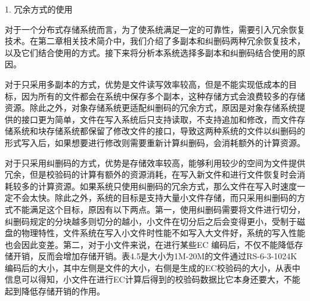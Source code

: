 1. 冗余方式的使用

对于一个分布式存储系统而言，为了使系统满足一定的可靠性，需要引入冗余恢复技术。在第二章相关技术简介中，我们介绍了多副本和纠删码两种冗余恢复技术，以及它们结合使用的方式。接下来将分析本系统选择多副本和纠删码结合使用的原因。

对于只采用多副本的方式，优势是文件读写效率较高，但是不能实现低成本的目标，因为所有的文件都会在系统中保存多个副本，这种存储方式会浪费较多的存储资源。除此之外，对象存储系统更适配纠删码的冗余方式，原因是对象存储系统提供的接口更为简单，文件在写入系统后只支持读取，不支持追加和修改，而文件存储系统和块存储系统都保留了修改文件的接口，导致这两种系统的文件以纠删码的形式写入后，如果想要进行修改则需要重新计算纠删码，会消耗额外的计算资源。

对于只采用纠删码的方式，优势是存储效率较高，能够利用较少的空间为文件提供冗余，但是校验码的计算有额外的资源消耗，在写入新文件和进行文件恢复时会消耗较多的计算资源。如果系统只使用纠删码的冗余方式，那么文件在写入时速度一定不会太快。除此之外，系统的目标是支持大量小文件存储，而只采用纠删码的方式不能满足这个目标，原因有以下两点。第一，使用纠删码需要将文件进行切分，纠删码规定的分块越多则切分的越小，小文件在切分后之后会变得更小，受制于磁盘的物理特性，文件系统在写入小文件时性能不如写入大文件好，系统的写入性能也会因此变差。第二，对于小文件来说，在进行某些EC 编码后，不仅不能降低存储开销，反而会增加存储开销。表4.5是大小为1M-20M的文件通过RS-6-3-1024K编码后的大小，其中左侧是文件的大小，右侧是生成的EC校验码的大小，从表中信息可以得知，小文件在进行EC计算后得到的校验码数据比它本身还要大，不能起到降低存储开销的作用。

